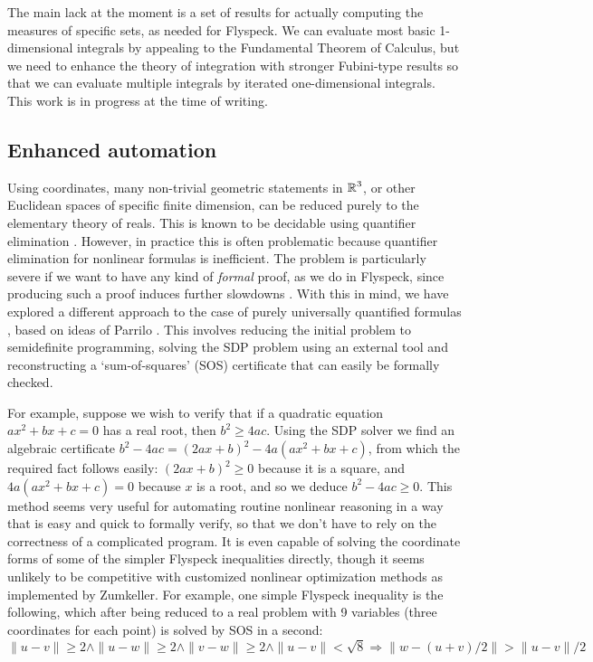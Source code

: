 \documentclass[11pt]{amsart}
\newcommand{\real}{\mbox{$\protect\mathbb R$}}
\let\And=\wedge                    %
\newcommand{\Imp}{\Rightarrow}
\begin{document}
The main lack at the moment is a set of results for actually computing the
measures of specific sets, as needed for Flyspeck. We can evaluate most basic
1-dimensional integrals by appealing to the Fundamental Theorem of Calculus,
but we need to enhance the theory of integration with stronger Fubini-type
results so that we can evaluate multiple integrals by iterated one-dimensional
integrals. This work is in progress at the time of writing.

\subsection*{Enhanced automation}

Using coordinates, many non-trivial geometric statements in $\real^3$, or other
Euclidean spaces of specific finite dimension, can be reduced purely to the
elementary theory of reals. This is known to be decidable using quantifier
elimination \cite{tarski-decision,collins,hormander-pdo2}. However, in practice
this is often problematic because quantifier elimination for nonlinear formulas
is inefficient. The problem is particularly severe if we want to have any kind
of {\em formal} proof, as we do in Flyspeck, since producing such a proof
induces further slowdowns \cite{mahboubi-hormander,mclaughlin-harrison}. With
this in mind, we have explored a different approach to the case of purely
universally quantified formulas \cite{harrison-sos}, based on ideas of Parrilo
\cite{parrilo-semidefinite}. This involves reducing the initial problem to
semidefinite programming, solving the SDP problem using an external tool and
reconstructing a `sum-of-squares' (SOS) certificate that can easily be formally
checked.

For example, suppose we wish to verify that if a quadratic equation $a x^2 + b
x + c = 0$ has a real root, then $b^2 \geq 4 a c$. Using the SDP solver we find
an algebraic certificate $b^2 - 4 a c = (2 a x + b)^2 - 4 a (a x^2 + b x + c)$,
from which the required fact follows easily: $(2 a x + b)^2 \geq 0$ because it
is a square, and $4 a (a x^2 + b x + c) = 0$ because $x$ is a root, and so we
deduce $b^2 - 4 a c \geq 0$. This method seems very useful for automating
routine nonlinear reasoning in a way that is easy and quick to formally verify,
so that we don't have to rely on the correctness of a complicated program. It
is even capable of solving the coordinate forms of some of the simpler Flyspeck
inequalities directly, though it seems unlikely to be competitive with
customized nonlinear optimization methods as implemented by Zumkeller. For
example, one simple Flyspeck inequality is the following, which after being
reduced to a real problem with 9 variables (three coordinates for each point)
is solved by SOS in a second:
$$ \|u - v\| \geq 2 \And \|u - w\| \geq 2 \And \|v - w\| \geq 2 \And
   \|u - v\| < \sqrt{8}
   \Imp \|w - (u + v)/2\| > \|u - v\|/2
$$
\end{document}
